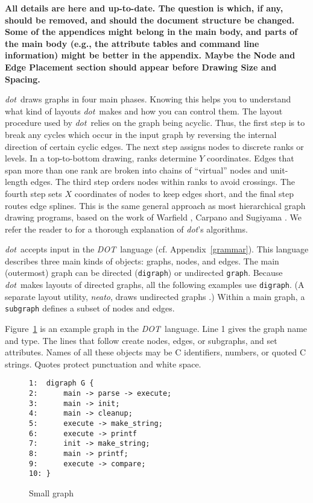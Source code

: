 \documentclass[11pt]{article}
\def\dot{{\it dot}}
\def\DOT{{\it DOT}}
\begin{document}
{\bf 
All details are here and up-to-date.
The question is which, if any, should be removed,
and should the document structure be changed. Some of the
appendices might belong in the main body, and parts of the main
body (e.g., the attribute tables and command line information) 
might be better in the appendix. Maybe the Node and Edge Placement
section should appear before Drawing Size and Spacing.
\fi

\dot\ draws graphs in four main phases.
Knowing this helps you to understand what kind of
layouts \dot\ makes and how you can control them.
The layout procedure used by \dot\ relies on the graph
being acyclic. Thus, the first step is to break any
cycles which occur in the input graph by reversing
the internal direction of certain cyclic edges.
The next step assigns nodes to discrete ranks or levels.
In a top-to-bottom drawing, ranks determine $Y$ coordinates.
Edges that span more than one rank are broken into chains
of ``virtual'' nodes and unit-length edges.
The third step orders nodes within ranks to avoid crossings.
The fourth step sets $X$ coordinates of nodes to keep edges short,
and the final step routes edge splines.
This is the same general approach as most hierarchical graph drawing
programs, based on the work of Warfield \cite{warfield},
Carpano \cite{carpano} and Sugiyama \cite{stt}.
We refer the reader to \cite{gknv:methods}
for a thorough explanation of \dot's algorithms.

\dot\ accepts input in the \DOT\ language (cf. Appendix~\ref{grammar}). 
This language describes three main kinds of objects:
graphs, nodes, and edges.
The main (outermost) graph can be directed
({\tt digraph}) or undirected {\tt graph}.
Because \dot\ makes layouts of directed graphs,
all the following examples use {\tt digraph}.
(A separate layout utility, {\it neato},
draws undirected graphs \cite{neatoguide}.)
Within a main graph, a {\tt subgraph} defines a
subset of nodes and edges.

Figure~\ref{fig:graph1} is an example graph in the \DOT\ language. 
Line 1 gives the graph name and type.
The lines that follow create nodes, edges, or subgraphs,
and set attributes. Names of all these objects may be
C identifiers, numbers, or quoted C strings.
Quotes protect punctuation and white space.

\begin{figure}[p]
\begin{verbatim}
1:  digraph G {
2:      main -> parse -> execute;
3:      main -> init;
4:      main -> cleanup;
5:      execute -> make_string;
6:      execute -> printf
7:      init -> make_string;
8:      main -> printf;
9:      execute -> compare;
10: }
\end{verbatim}
\caption{Small graph}
\label{fig:graph1}
\end{figure}

}
\end{document}
